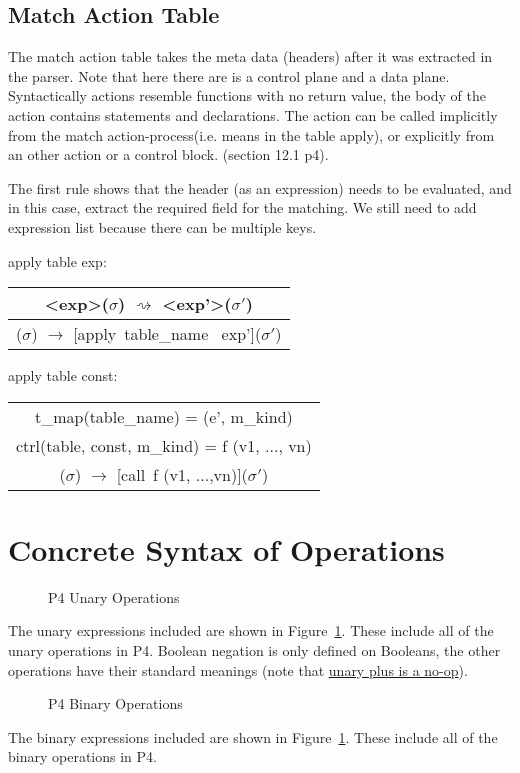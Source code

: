 \documentclass[UTF8]{article}
\makeatletter
\newcommand*{\inference}[3][t]{%
   \begingroup
   \def\and{\\}%
   \begin{tabular}[#1]{@{\enspace}c@{\enspace}}
   #2 \\
   \hline
   #3
   \end{tabular}%
   \endgroup
}
\makeatother
\begin{document}
\subsection{Match Action Table}
 The match action table takes the meta data (headers) after it was extracted in the parser. Note that here there are is a control plane and a data plane. 
Syntactically actions resemble functions with no return value, the body of the action contains statements and declarations. The action can be called implicitly from the match action-process(i.e. means in the table apply), or explicitly from an other action or a control block. (section 12.1 p4).

The first rule shows that the header (as an expression) needs to be evaluated, and in this case, extract the required field for the matching. 
We still need to add expression list because there can be multiple keys.

\bigskip
apply table exp:
\bigskip
\inference[c]{<exp>($\sigma$) $\rightsquigarrow$ <exp'>($\sigma '$) }
            {[apply table\_name exp]($\sigma$) $\rightarrow$ [apply\ table\_name \ exp']($\sigma'$)} \bigskip

\bigskip
apply table const:
\bigskip
\inference[c]{t\_map(table\_name) = (e', m\_kind)
            \and ctrl(table\name, const, m\_kind) = f (v1, ..., vn) } 
            {[apply table\_name const]($\sigma$) $\rightarrow$ [call\ f (v1, ...,vn)]($\sigma'$)}
\bigskip
              

\printbibliography

\clearpage
\appendix
\section{Concrete Syntax of Operations}
\label{app:op}
\begin{figure}[ht!]
\centering\ottgrammartabular{
\ottunop\ottafterlastrule
}
\caption{P4 Unary Operations}
\label{fig:unop}
\end{figure}

The unary expressions included are shown in Figure~\ref{fig:unop}. These include all of the unary operations in P4. Boolean negation is only defined on Booleans, the other operations have their standard meanings (note that \href{https://p4.org/p4-spec/docs/P4-16-v1.2.1.html#sec-bit-ops}{unary plus is a no-op}).

\newpage
\begin{figure}[ht!]
\centering\ottgrammartabular{
\ottbinop\ottafterlastrule
}
\caption{P4 Binary Operations}
\label{fig:binop}
\end{figure}

The binary expressions included are shown in Figure~\ref{fig:unop}. These include all of the binary operations in P4.
\end{document}
